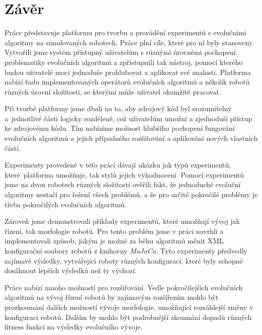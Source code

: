 \chapter*{Závěr}
Práce představuje platformu pro tvorbu a provádění experimentů s evolučními
algoritmy na simulovaných robotech. Práce plní cíle, které pro ní byly
stanoveny. Vytvořili jsme systém přístupný uživatelům s různými úrovněmi
pochopení problematiky evolučních algoritmů a zpřístupnili tak nástroj, pomocí
kterého budou uživatelé moci jednoduše prohlubovat a aplikovat své znalosti.
Platforma nabízí řadu implementovaných operátorů evolučních algoritmů a několik
robotů různých úrovní složitosti, se kterými může uživatel okamžitě pracovat.

Při tvorbě platformy jsme dbali na to, aby zdrojový kód byl srozumitelný
a~jednotlivé části logicky rozdělené, což uživatelům umožní a zjednoduší
přístup ke zdrojovému kódu. Tím nabízíme možnost hlubšího pochopení fungování
evolučních algoritmů a jejich případného rozšiřování a aplikování nových
vlastních částí.

Experimenty provedené v této práci dávají ukázku jak typů experimentů,
které~platforma umožňuje, tak stylů jejich vyhodnocení. Pomocí experimentů jsme
na dvou robotech různých složitostí ověřili fakt, že jednoduché evoluční
algoritmy nestačí pro řešení všech problémů, a že pro určité pokročilé problémy
je třeba pokročilých evolučních algoritmů. 

Zároveň jsme demonstrovali příklady experimentů, které umožňují vývoj jak
řízení, tak morfologie robotů. Pro tento problém jsme v práci navrhli a
implementovali způsob, jakým je možné za běhu algoritmů měnit XML konfigurační
soubory robotů z knihovny \emph{MuJoCo}. Tyto experimenty předvedly zajímavé
výsledky, vytvářející roboty různých konfigurací, které byly schopné dosáhnout
lepších výsledků než ty výchozí.

Práce nabízí mnoho možností pro rozšiřování. Vedle pokročilejších evolučních
algoritmů na vývoj řízení robotů by zajímavým rozšířením mohlo být prozkoumání dalších
možností vývoje morfologie, umožňující rozsáhlejší změny v konfiguraci robotů.
Dalším by mohlo být podrobnější zkoumání dopadů různých fitness funkcí na
výsledky evolučního vývoje.

